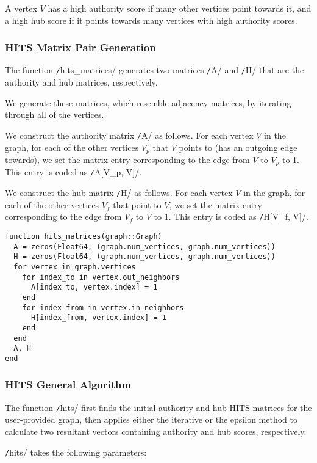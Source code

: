 \documentclass[12pt, titlepage, twoside]{amsart}
\begin{document}
A vertex $V$ has a high authority score if many other vertices point towards it,
and a high hub score if it points towards many vertices with high authority scores.

\subsubsection{HITS Matrix Pair Generation}

The function \texttt/hits_matrices/ generates two matrices \texttt/A/ and \texttt/H/
that are the authority and hub matrices, respectively.

We generate these matrices, which resemble adjacency matrices, by iterating through all of the vertices.

We construct the authority matrix \texttt/A/ as follows.
For each vertex $V$ in the graph, for each of the other vertices $V_p$ that $V$ points to
(has an outgoing edge towards),
we set the matrix entry corresponding to the edge from $V$ to $V_p$ to 1.
This entry is coded as \texttt/A[V_p, V]/.

We construct the hub matrix \texttt/H/ as follows.
For each vertex $V$ in the graph, for each of the other vertices $V_f$ that point to $V$,
we set the matrix entry corresponding to the edge from $V_f$ to $V$ to 1.
This entry is coded as \texttt/H[V_f, V]/.

\begin{verbatim}
function hits_matrices(graph::Graph)
  A = zeros(Float64, (graph.num_vertices, graph.num_vertices))
  H = zeros(Float64, (graph.num_vertices, graph.num_vertices))
  for vertex in graph.vertices
    for index_to in vertex.out_neighbors
      A[index_to, vertex.index] = 1
    end
    for index_from in vertex.in_neighbors
      H[index_from, vertex.index] = 1
    end
  end
  A, H
end
\end{verbatim}

\subsubsection{HITS General Algorithm}

The function \texttt/hits/ first finds the initial authority and hub HITS matrices
for the user-provided graph,
then applies either the iterative or the epsilon method to calculate
two resultant vectors containing authority and hub scores, respectively.

\texttt/hits/ takes the following parameters:
\end{document}
